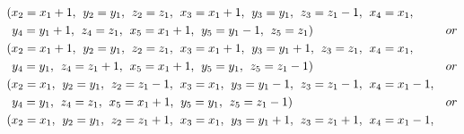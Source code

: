 \begin{align*}
&(x_{2}=x_{1}+1,\hspace{1ex} y_{2}=y_{1},\hspace{1ex} z_{2}=z_{1},\hspace{1ex} x_{3}=x_{1}+1,\hspace{1ex} y_{3}=y_{1},\hspace{1ex} z_{3}=z_{1}-1,\hspace{1ex} x_{4}=x_{1},\\
&\hspace{1ex} y_{4}=y_{1}+1,\hspace{1ex} z_{4}=z_{1},\hspace{1ex} x_{5}=x_{1}+1,\hspace{1ex} y_{5}=y_{1}-1,\hspace{1ex} z_{5}=z_{1})&or\\
&(x_{2}=x_{1}+1,\hspace{1ex} y_{2}=y_{1},\hspace{1ex} z_{2}=z_{1},\hspace{1ex} x_{3}=x_{1}+1,\hspace{1ex} y_{3}=y_{1}+1,\hspace{1ex} z_{3}=z_{1},\hspace{1ex} x_{4}=x_{1},\\
&\hspace{1ex} y_{4}=y_{1},\hspace{1ex} z_{4}=z_{1}+1,\hspace{1ex} x_{5}=x_{1}+1,\hspace{1ex} y_{5}=y_{1},\hspace{1ex} z_{5}=z_{1}-1)&or\\ 
&(x_{2}=x_{1},\hspace{1ex} y_{2}=y_{1},\hspace{1ex} z_{2}=z_{1}-1,\hspace{1ex} x_{3}=x_{1},\hspace{1ex} y_{3}=y_{1}-1,\hspace{1ex} z_{3}=z_{1}-1,\hspace{1ex} x_{4}=x_{1}-1,\\
&\hspace{1ex} y_{4}=y_{1},\hspace{1ex} z_{4}=z_{1},\hspace{1ex} x_{5}=x_{1}+1,\hspace{1ex} y_{5}=y_{1},\hspace{1ex} z_{5}=z_{1}-1)&or\\ 
&(x_{2}=x_{1},\hspace{1ex} y_{2}=y_{1},\hspace{1ex} z_{2}=z_{1}+1,\hspace{1ex} x_{3}=x_{1},\hspace{1ex} y_{3}=y_{1}+1,\hspace{1ex} z_{3}=z_{1}+1,\hspace{1ex} x_{4}=x_{1}-1,\\

\end{align*}
